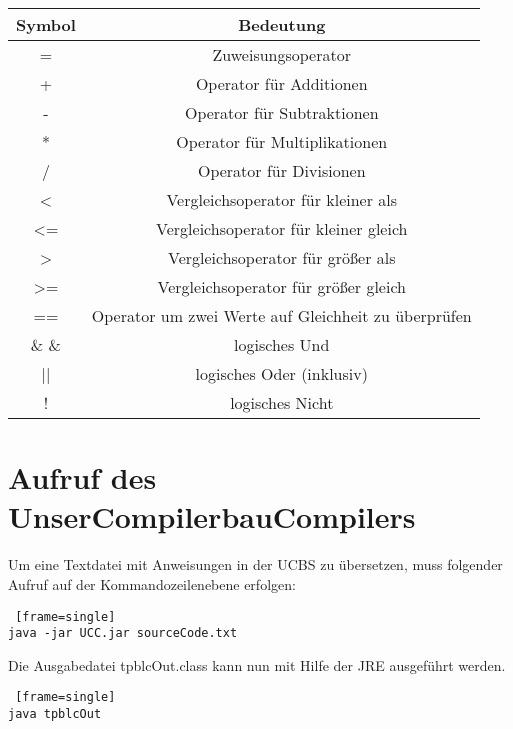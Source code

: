 \begin{center}
  \begin{tabular}{ | c | c | }
    \hline
    Symbol & Bedeutung\\ \hline \hline
    = & Zuweisungsoperator\\ \hline
    + & Operator für Additionen\\ \hline
    - & Operator für Subtraktionen\\ \hline
    * & Operator für Multiplikationen\\ \hline
    / & Operator für Divisionen\\ \hline
    
    < & Vergleichsoperator für kleiner als\\ \hline
    <= & Vergleichsoperator für kleiner gleich\\ \hline
    > & Vergleichsoperator für größer als\\ \hline
    >= & Vergleichsoperator für größer gleich\\ \hline    
    == & Operator um zwei Werte auf Gleichheit zu überprüfen\\ \hline    
    
    \& \&  & logisches Und \\ \hline    
    || & logisches Oder (inklusiv) \\ \hline    
    ! & logisches Nicht \\ \hline    
    
  \end{tabular}
\end{center}
	
\section{Aufruf des UnserCompilerbauCompilers}
Um eine Textdatei mit Anweisungen in der UCBS zu übersetzen, muss folgender Aufruf auf der Kommandozeilenebene erfolgen:
\begin{lstlisting} [frame=single]
java -jar UCC.jar sourceCode.txt 
\end{lstlisting}
Die Ausgabedatei tpblcOut.class kann nun mit Hilfe der JRE ausgeführt werden.
\begin{lstlisting} [frame=single]
java tpblcOut
\end{lstlisting}
